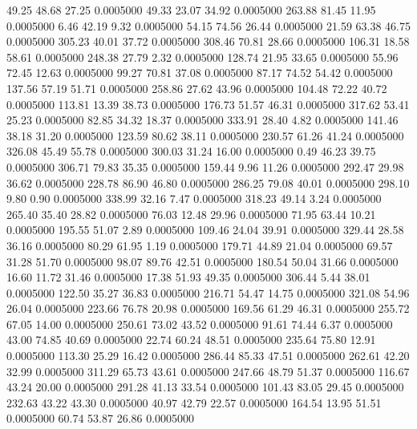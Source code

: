   49.25   48.68   27.25   0.0005000
  49.33   23.07   34.92   0.0005000
 263.88   81.45   11.95   0.0005000
   6.46   42.19    9.32   0.0005000
  54.15   74.56   26.44   0.0005000
  21.59   63.38   46.75   0.0005000
 305.23   40.01   37.72   0.0005000
 308.46   70.81   28.66   0.0005000
 106.31   18.58   58.61   0.0005000
 248.38   27.79    2.32   0.0005000
 128.74   21.95   33.65   0.0005000
  55.96   72.45   12.63   0.0005000
  99.27   70.81   37.08   0.0005000
  87.17   74.52   54.42   0.0005000
 137.56   57.19   51.71   0.0005000
 258.86   27.62   43.96   0.0005000
 104.48   72.22   40.72   0.0005000
 113.81   13.39   38.73   0.0005000
 176.73   51.57   46.31   0.0005000
 317.62   53.41   25.23   0.0005000
  82.85   34.32   18.37   0.0005000
 333.91   28.40    4.82   0.0005000
 141.46   38.18   31.20   0.0005000
 123.59   80.62   38.11   0.0005000
 230.57   61.26   41.24   0.0005000
 326.08   45.49   55.78   0.0005000
 300.03   31.24   16.00   0.0005000
   0.49   46.23   39.75   0.0005000
 306.71   79.83   35.35   0.0005000
 159.44    9.96   11.26   0.0005000
 292.47   29.98   36.62   0.0005000
 228.78   86.90   46.80   0.0005000
 286.25   79.08   40.01   0.0005000
 298.10    9.80    0.90   0.0005000
 338.99   32.16    7.47   0.0005000
 318.23   49.14    3.24   0.0005000
 265.40   35.40   28.82   0.0005000
  76.03   12.48   29.96   0.0005000
  71.95   63.44   10.21   0.0005000
 195.55   51.07    2.89   0.0005000
 109.46   24.04   39.91   0.0005000
 329.44   28.58   36.16   0.0005000
  80.29   61.95    1.19   0.0005000
 179.71   44.89   21.04   0.0005000
  69.57   31.28   51.70   0.0005000
  98.07   89.76   42.51   0.0005000
 180.54   50.04   31.66   0.0005000
  16.60   11.72   31.46   0.0005000
  17.38   51.93   49.35   0.0005000
 306.44    5.44   38.01   0.0005000
 122.50   35.27   36.83   0.0005000
 216.71   54.47   14.75   0.0005000
 321.08   54.96   26.04   0.0005000
 223.66   76.78   20.98   0.0005000
 169.56   61.29   46.31   0.0005000
 255.72   67.05   14.00   0.0005000
 250.61   73.02   43.52   0.0005000
  91.61   74.44    6.37   0.0005000
  43.00   74.85   40.69   0.0005000
  22.74   60.24   48.51   0.0005000
 235.64   75.80   12.91   0.0005000
 113.30   25.29   16.42   0.0005000
 286.44   85.33   47.51   0.0005000
 262.61   42.20   32.99   0.0005000
 311.29   65.73   43.61   0.0005000
 247.66   48.79   51.37   0.0005000
 116.67   43.24   20.00   0.0005000
 291.28   41.13   33.54   0.0005000
 101.43   83.05   29.45   0.0005000
 232.63   43.22   43.30   0.0005000
  40.97   42.79   22.57   0.0005000
 164.54   13.95   51.51   0.0005000
  60.74   53.87   26.86   0.0005000
